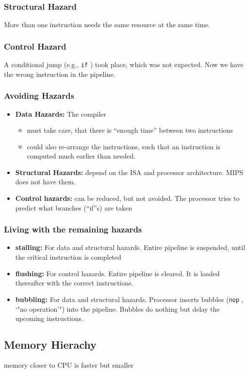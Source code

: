 \documentclass[german]{latex4ei/latex4ei_sheet}
\begin{document}
\begin{sectionbox}
\subsubsection{Structural Hazard}
More than one instruction needs the same resource at the same time.

\subsubsection{Control Hazard}
A conditional jump (e.g., \texttt{if} ) took place, which was not expected. Now we have the wrong instruction in the pipeline.

\subsubsection{Avoiding Hazards}
\begin{itemize}
\item \textbf{Data Hazards:} The compiler
\begin{itemize}
\item must take care, that there is "`enough time"' between two instructions
\item could also re-arrange the instructions, such that an instruction is computed much earlier than needed.
\end{itemize}
\item \textbf{Structural Hazards:} depend on the ISA and processor architecture. MIPS does not have them.
\item \textbf{Control hazards:} can be reduced, but not avoided. The processor tries to predict what branches ("`if"'s) are taken
\end{itemize}
\end{sectionbox}

\begin{sectionbox}
\subsubsection{Living with the remaining hazards}
\begin{itemize}
\item \textbf{stalling:} For data and structural hazards. Entire pipeline is suspended, until the critical instruction is completed
\item \textbf{flushing:} For control hazards. Entire pipeline is cleared. It is loaded thereafter with the correct instructions.
\item \textbf{bubbling:} For data and structural hazards. Processor inserts bubbles (\texttt{nop} , `"no operation'") into the pipeline. Bubbles do nothing but delay the upcoming instructions.
\end{itemize}

\subsection{Memory Hierachy}
memory closer to CPU is faster but smaller
\begin{center}

\end{center}
\end{sectionbox}
\end{document}
